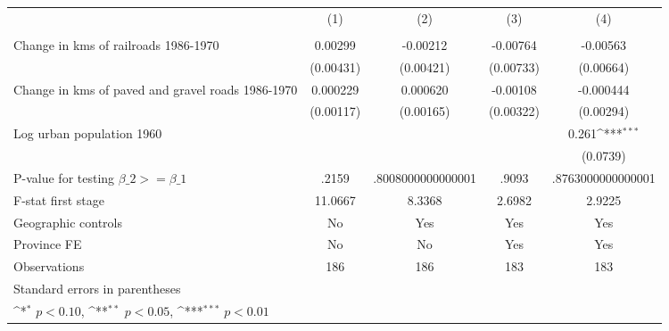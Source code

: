 {
\def\sym#1{\ifmmode^{#1}\else\(^{#1}\)\fi}
\begin{tabular}{l*{4}{c}}
\hline\hline
                &\multicolumn{1}{c}{(1)}&\multicolumn{1}{c}{(2)}&\multicolumn{1}{c}{(3)}&\multicolumn{1}{c}{(4)}\\
                &\multicolumn{1}{c}{}&\multicolumn{1}{c}{}&\multicolumn{1}{c}{}&\multicolumn{1}{c}{}\\
\hline
Change in kms of railroads 1986-1970&  0.00299         & -0.00212         & -0.00764         & -0.00563         \\
                &(0.00431)         &(0.00421)         &(0.00733)         &(0.00664)         \\
[1em]
Change in kms of paved and gravel roads 1986-1970& 0.000229         & 0.000620         & -0.00108         &-0.000444         \\
                &(0.00117)         &(0.00165)         &(0.00322)         &(0.00294)         \\
[1em]
Log urban population 1960&                  &                  &                  &    0.261\sym{***}\\
                &                  &                  &                  & (0.0739)         \\
\hline
P-value for testing $\beta\_{2} >= \beta\_{1}$&    .2159         &.8008000000000001         &    .9093         &.8763000000000001         \\
F-stat first stage&  11.0667         &   8.3368         &   2.6982         &   2.9225         \\
Geographic controls&       No         &      Yes         &      Yes         &      Yes         \\
Province FE     &       No         &       No         &      Yes         &      Yes         \\
Observations    &      186         &      186         &      183         &      183         \\
\hline\hline
\multicolumn{5}{l}{\footnotesize Standard errors in parentheses}\\
\multicolumn{5}{l}{\footnotesize \sym{*} \(p<0.10\), \sym{**} \(p<0.05\), \sym{***} \(p<0.01\)}\\
\end{tabular}
}
